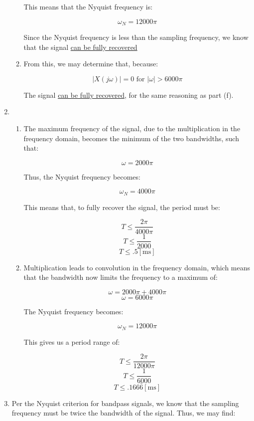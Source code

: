 \begin{enumerate}
\begin{enumerate}
        This means that the Nyquist frequency is:

        $$\omega_N=12000\pi$$

        Since the Nyquist frequency is less than the sampling frequency, we know that the signal \underline{can be fully recovered}
        
      \item From this, we may determine that, because:

        $$|X(j\omega)|=0\text{  for  }|\omega|>6000\pi$$

        The signal \underline{can be fully recovered}, for the same reasoning as part (f).
        
    \end{enumerate}

  \item

    \begin{enumerate}

      \item The maximum frequency of the signal, due to the multiplication in the frequency domain, becomes the minimum of the two bandwidths, such that:

        $$\omega=2000\pi$$

        Thus, the Nyquist frequency becomes:

        $$\omega_N=4000\pi$$

        This means that, to fully recover the signal, the period must be:

        $$T\leq \frac{2\pi}{4000\pi}$$
        $$T\leq \frac{1}{2000}$$
        $$\boxed{T\leq .5[\si{\milli\second}]}$$

      \item Multiplication leads to convolution in the frequency domain, which means that the bandwidth now limits the frequency to a maximum of:

        $$\omega=2000\pi+4000\pi$$
        $$\omega=6000\pi$$

        The Nyquist frequency becomes:

        $$\omega_N=12000\pi$$

        This gives us a period range of:

        $$T\leq\frac{2\pi}{12000\pi}$$
        $$T\leq\frac{1}{6000}$$
        $$\boxed{T\leq.166\bar{6}[\si{\milli\second}]}$$

    \end{enumerate}

  \item Per the Nyquist criterion for bandpass signals, we know that the sampling frequency must be twice the bandwidth of the signal. Thus, we may find:


\end{enumerate}
